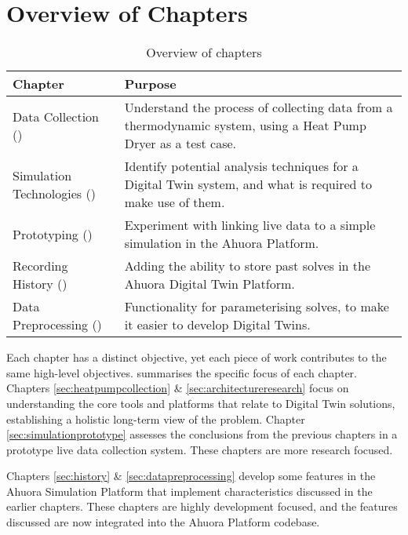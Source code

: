 \section{Overview of Chapters}

\begin{table}[ht]
    \centering
    \caption{Overview of chapters}
    \label{tab:research_chapters}
    \begin{tabular}{|L{4.5cm}|p{11.5cm}|}
    \hline
    \textbf{Chapter} & \textbf{Purpose} \\
    \hline
    Data Collection \mbox{()}& Understand the process of collecting data from a thermodynamic system, using a Heat Pump Dryer as a test case. \\ \hline
    Simulation Technologies \mbox{()}& Identify potential analysis techniques for a Digital Twin system, and what is required to make use of them. \\\hline
    Prototyping \mbox{()}& Experiment with linking live data to a simple simulation in the Ahuora Platform. \\\hline
    Recording History \mbox{()}& Adding the ability to store past solves in the Ahuora Digital Twin Platform. \\\hline
    Data Preprocessing \mbox{()}& Functionality for parameterising solves, to make it easier to develop Digital Twins. \\
    \hline
    \end{tabular}
\end{table}

Each chapter has a distinct objective, yet each piece of work contributes to the same high-level objectives.  summarises the specific focus of each chapter. 
Chapters \ref{sec:heatpumpcollection} \& \ref{sec:architectureresearch} focus on understanding the core tools and platforms that relate to Digital Twin solutions, establishing a holistic long-term view of the problem. Chapter \ref{sec:simulationprototype} assesses the conclusions from the previous chapters in a prototype live data collection system. These chapters are more research focused.

Chapters \ref{sec:history} \& \ref{sec:datapreprocessing} develop some features in the Ahuora Simulation Platform that implement characteristics discussed in the earlier chapters. These chapters are highly development focused, and the features discussed are now integrated into the Ahuora Platform codebase.

